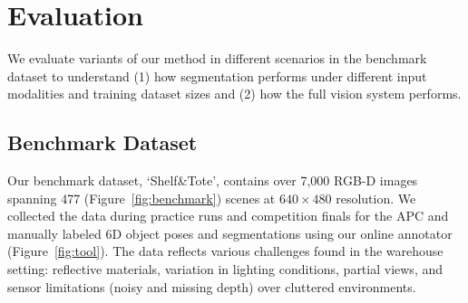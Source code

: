 \documentclass[letterpaper, 10 pt, conference]{ieeeconf}  %
\newcommand{\figref}[1]{Figure~\ref{#1}}
\begin{document}
\section{Evaluation}
%
We evaluate variants of our method in different scenarios in the benchmark dataset to understand (1) how segmentation performs under different input modalities and training dataset sizes and (2) how the full vision system performs.



\subsection{Benchmark Dataset}
\label{ref:benchmark}
%
Our benchmark dataset, `Shelf\&Tote', contains over 7,000 RGB-D images spanning 477 (\figref{fig:benchmark}) scenes at $640\times{480}$ resolution. We collected the data during practice runs and competition finals for the APC and manually labeled 6D object poses and segmentations using our online annotator (\figref{fig:tool}). The data reflects various challenges found in the warehouse setting: reflective materials, variation in lighting conditions, partial views, and sensor limitations (noisy and missing depth) over cluttered environments.

\end{document}

